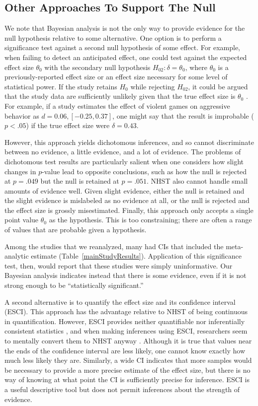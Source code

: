 \documentclass[man]{apa6}
\begin{document}
\subsection{Other Approaches To Support The Null}
We note that Bayesian analysis is not the only way to provide evidence for the null hypothesis relative to some alternative.  One option is to perform a significance test against a second null hypothesis of some effect. For example, when failing to detect an anticipated effect, one could test against the expected effect size $\theta_0$ with the secondary null hypothesis $H_{02}: \delta = \theta_0$, where $\theta_0$ is a previously-reported effect size or an effect size necessary for some level of statistical power. If the study retains $H_0$ while rejecting $H_{02}$, it could be argued that the study data are sufficiently unlikely given that the true effect size is $\theta_0$ \citep[e.g.,][]{Simonsohn:etal:2014}. For example, if a study estimates the effect of violent games on aggressive behavior as $d = 0.06, [-0.25, 0.37]$, one might say that the result is improbable ($p < .05$) if the true effect size were $\delta = 0.43$.

However, this approach yields dichotomous inferences, and so cannot discriminate between no evidence, a little evidence, and a lot of evidence. The problems of dichotomous test results are particularly salient when one considers how slight changes in $p$-value lead to opposite conclusions, such as how the null is rejected at $p = .049$ but the null is retained at $p = .051$. NHST also cannot handle small amounts of evidence well. Given slight evidence, either the null is retained and the slight evidence is mislabeled as no evidence at all, or the null is rejected and the effect size is grossly misestimated. Finally, this approach only accepts a single point value $\theta_0$ as the hypothesis. This is too constraining; there are often a range of values that are probable given a hypothesis. 

Among the studies that we reanalyzed, many had CIs that included the meta-analytic estimate (Table~\ref{mainStudyResults}). Application of this significance test, then, would report that these studies were simply uninformative. Our Bayesian analysis indicates instead that there is some evidence, even if it is not strong enough to be ``statistically significant.''   

A second alternative is to quantify the effect size and its confidence interval (ESCI). This approach has the advantage relative to NHST of being continuous in quantification.  However, ESCI provides neither quantifiable nor inferentially consistent statistics \citep[see][]{Morey:etal:2014}, and when making inferences using ESCI, researchers seem to mentally convert them to NHST anyway \citep{Hoekstra:etal:2014}.  Although it is true that values near the ends of the confidence interval are less likely, one cannot know exactly how much less likely they are. Similarly, a wide CI indicates that more samples would be necessary to provide a more precise estimate of the effect size, but there is no way of knowing at what point the CI is sufficiently precise for inference. ESCI is a useful descriptive tool but does not permit inferences about the strength of evidence.
\end{document}
